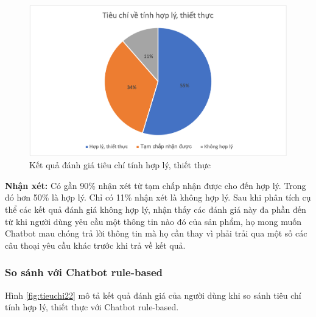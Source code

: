 \begin{center}
    \begin{figure}[h!]
        \begin{center}
         \includegraphics[scale=0.91]{chapter7/img/tieuchi2.png}
        \end{center}
        \caption{Kết quả đánh giá tiêu chí tính hợp lý, thiết thực}
        \label{fig:tieuchi2}
    \end{figure}
\end{center}

\textbf{Nhận xét:}
Có gần 90\% nhận xét từ tạm chấp nhận được cho đến hợp lý. Trong đó hơn 50\% là hợp lý. Chỉ có 11\% nhận xét là không hợp lý. Sau khi phân tích cụ thể các kết quả đánh giá không hợp lý, nhận thấy các đánh giá này đa phần đến từ khi người dùng yêu cầu một thông tin nào đó của sản phẩm, họ mong muốn Chatbot mau chóng trả lời thông tin mà họ cần thay vì phải trải qua một số các câu thoại yêu cầu khác trước khi trả về kết quả.

\subsubsection{So sánh với Chatbot rule-based}
Hình \ref{fig:tieuchi22} mô tả kết quả đánh giá của người dùng khi so sánh tiêu chí tính hợp lý, thiết thực với Chatbot rule-based.


